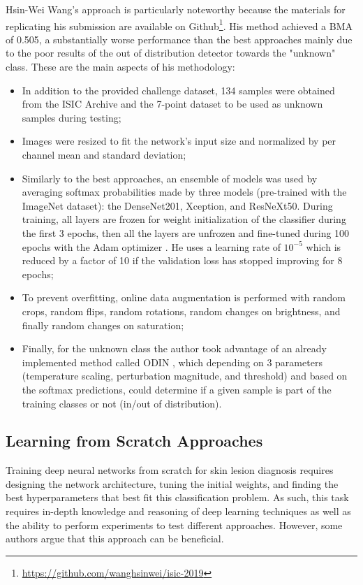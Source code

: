     Hsin-Wei Wang's approach \cite{Wang} is particularly noteworthy because the materials for replicating his submission are available on Github\footnote{\url{https://github.com/wanghsinwei/isic-2019}}. His method achieved a \ac{BMA} of 0.505, a substantially worse performance than the best approaches mainly due to the poor results of the out of distribution detector towards the "unknown" class. These are the main aspects of his methodology: 
    \begin{itemize}
        \item In addition to the provided challenge dataset, 134 samples were obtained from the \ac{ISIC} Archive and the 7-point dataset \cite{Kawahara2018-7pt} to be used as unknown samples during testing;
        
        \item Images were resized to fit the network's input size and normalized by per channel mean and standard deviation;
        
        \item Similarly to the best approaches, an ensemble of models was used by averaging softmax probabilities made by three models (pre-trained with the ImageNet dataset): the DenseNet201, Xception, and ResNeXt50. During training, all layers are frozen for weight initialization of the classifier during the first 3 epochs, then all the layers are unfrozen and fine-tuned during 100 epochs with the Adam optimizer \cite{adam}. He uses a learning rate of $10^{-5}$ which is reduced by a factor of 10 if the validation loss has stopped improving for 8 epochs;
        
        \item To prevent overfitting, online data augmentation is performed with random crops, random flips, random rotations, random changes on brightness, and finally random changes on saturation;
        
        \item Finally, for the unknown class the author took advantage of an already implemented method called \ac{ODIN} \cite{odin}, which depending on 3 parameters (temperature scaling, perturbation magnitude, and threshold) and based on the softmax predictions, could determine if a given sample is part of the training classes or not (in/out of distribution).
    \end{itemize}
    
    
\subsection{Learning from Scratch Approaches}
    Training deep neural networks from scratch for skin lesion diagnosis requires designing the network architecture, tuning the initial weights, and finding the best hyperparameters that best fit this classification problem. As such, this task requires in-depth knowledge and reasoning of deep learning techniques as well as the ability to perform experiments to test different approaches.
    However, some authors argue that this approach can be beneficial. \par 
    
